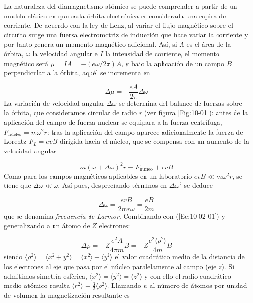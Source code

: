 La naturaleza del diamagnetismo atómico se puede comprender a partir de un modelo clásico en que cada órbita electrónica es considerada una espira de corriente. De acuerdo con la ley de Lenz, al variar el flujo magnético sobre el circuito surge una fuerza electromotriz de inducción que hace variar la corriente y por tanto genera un momento magnético adicional. Así, si $A$ es el área de la órbita, $\omega$ la velocidad angular e $I$ la intensidad de corriente, el momento magnético será $\mu=IA=-(e\omega / 2\pi)A$, y bajo la aplicación de un campo $B$ perpendicular a la órbita, aquél se incrementa en

\begin{equation}
	\Delta \mu = - \frac{eA}{2\pi} \Delta \omega \label{Ec:10-02-01}
\end{equation}
La variación de velocidad angular $\Delta \omega$ se determina del balance de fuerzas sobre la órbita, que consideramos circular de radio $r$ (ver figura \ref{Fig:10-01}): antes de la aplicación del campo de fuerza nuclear se equipara a la fuerza centrífuga, $F_\text{núcleo} = m\omega^2 r$; tras la aplicación del campo aparece adicionalmente la fuerza de Lorentz $F_L = ev B$ dirigida hacia el núcleo, que se compensa con un aumento de la velocidad angular 

\begin{equation}
	m(\omega + \Delta \omega)^2 r = F_\text{núcleo} + e v B
\end{equation}
Como para los campos magnéticos aplicables en un laboratorio $evB\ll m \omega^2 r$, se tiene que $\Delta \omega \ll \omega$. Así pues, despreciando términos en $\Delta \omega^2$ se deduce 

\begin{equation}
	\Delta \omega = \frac{evB}{2mr\omega} = \frac{eB}{2m}
\end{equation}
que se denomina \textit{frecuencia de Larmor}. Combinando con (\ref{Ec:10-02-01}) y generalizando a un átomo de $Z$ electrones:

\begin{equation}
	\Delta \mu = - Z \frac{e^2A}{4\pi m} B = - Z \frac{e^2 \langle \rho^2 \rangle}{4m}B
\end{equation}
siendo $\langle \rho^2 \rangle = \langle x^2 + y^2 \rangle = \langle x^2 \rangle + \langle y^2 \rangle$ el valor cuadrático medio de la distancia de los electrones al eje que pasa por el núcleo paralelamente al campo (eje $z$). Si admitimos simetría esférica, $\langle x^2 \rangle=\langle y^2 \rangle=\langle z^2 \rangle$ y con ello el radio cuadrático medio atómico resulta $\langle r^2 \rangle = \frac{3}{2} \langle \rho^2 \rangle$. Llamando $n$ al número de átomos por unidad de volumen la magnetización resultante es

